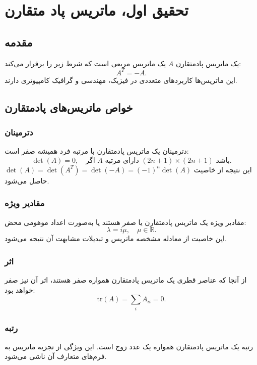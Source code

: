 
\chapter*{تحقیق اول، ماتریس پاد متقارن}

\section*{مقدمه}
یک ماتریس پادمتقارن $A$ یک ماتریس مربعی است که شرط زیر را برقرار می‌کند:
\begin{equation}
	A^T = -A.
\end{equation}
این ماتریس‌ها کاربردهای متعددی در فیزیک، مهندسی و گرافیک کامپیوتری دارند.

\section*{خواص ماتریس‌های پادمتقارن}

\subsection*{دترمینان}
دترمینان یک ماتریس پادمتقارن با مرتبه فرد همیشه صفر است:
\begin{equation}
	\det(A) = 0, \quad \text{اگر } A \text{ دارای مرتبه } (2n+1) \times (2n+1) \text{ باشد}.
\end{equation}
این نتیجه از خاصیت $\det(A) = \det(A^T) = \det(-A) = (-1)^n \det(A)$ حاصل می‌شود.

\subsection*{مقادیر ویژه}
مقادیر ویژه یک ماتریس پادمتقارن یا صفر هستند یا به‌صورت اعداد موهومی محض:
\begin{equation}
	\lambda = i \mu, \quad \mu \in \mathbb{R}.
\end{equation}
این خاصیت از معادله مشخصه ماتریس و تبدیلات مشابهت آن نتیجه می‌شود.

\subsection*{اثر}
از آنجا که عناصر قطری یک ماتریس پادمتقارن همواره صفر هستند، اثر آن نیز صفر خواهد بود:
\begin{equation}
	\text{tr}(A) = \sum_{i} A_{ii} = 0.
\end{equation}

\subsection*{رتبه}
رتبه یک ماتریس پادمتقارن همواره یک عدد زوج است. این ویژگی از تجزیه ماتریس به فرم‌های متعارف آن ناشی می‌شود.

